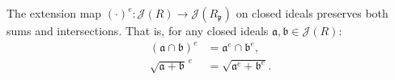 The extension map $(\cdot)^e : \mathcal{J}(R) \to \mathcal{J}(R_{\mathfrak{p}})$ on closed ideals preserves both sums and intersections. That is, for any closed ideals $\mathfrak{a}, \mathfrak{b} \in \mathcal{J}(R)$:
\begin{align*}
(\mathfrak{a} \cap \mathfrak{b})^e &= \mathfrak{a}^e \cap \mathfrak{b}^e, \\
\sqrt{\mathfrak{a} + \mathfrak{b}}^{\,e} &= \sqrt{\mathfrak{a}^e + \mathfrak{b}^e}.
\end{align*}
